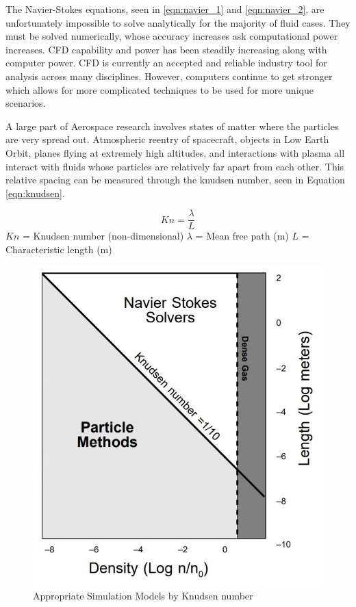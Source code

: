 \indent The Navier-Stokes equations, seen in  \ref{eqn:navier_1} and \ref{eqn:navier_2}\cite{navier_eqns}, are unfortunately impossible to solve analytically for the majority of fluid cases. They must be solved numerically, whose accuracy increases ask computational power increases. CFD capability and power has been steadily increasing along with computer power. CFD is currently an accepted and reliable industry tool for analysis across many disciplines. However, computers continue to get stronger which allows for more complicated techniques to be used for more unique scenarios. \par

\indent A large part of Aerospace research involves states of matter where the particles are very spread out. Atmospheric reentry of spacecraft, objects in Low Earth Orbit, planes flying at extremely high altitudes, and interactions with plasma all interact with fluids whose particles are relatively far apart from each other. This relative spacing can be measured through the knudsen number, seen in Equation \ref{eqn:knudsen}. \par

\begin{equation}
    \label{eqn:knudsen}
    Kn = \frac{\lambda}{L}
\end{equation}
\(Kn\) = Knudsen number (non-dimensional) \newline
\(\lambda\) = Mean free path (m) \newline
\(L\) = Characteristic length (m) \par


\begin{figure}
    \includegraphics[width=.55\textwidth]{figures/navier.JPG}
    \centering
    \caption{Appropriate Simulation Models by Knudsen number \newline \cite{navier} }
    \label{fig:navier}
\end{figure}



